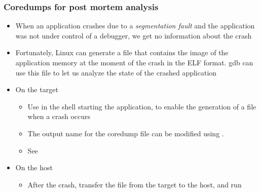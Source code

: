 \begin{frame}
  \frametitle{Coredumps for post mortem analysis}
  \begin{itemize}
  \item When an application crashes due to a {\em segmentation fault}
    and the application was not under control of a debugger, we get no
    information about the crash
  \item Fortunately, Linux can generate a  file that
    contains the image of the application memory at the moment of the
    crash in the ELF format. gdb can use this  file to let
    us analyze the state of the crashed application
  \item On the target
    \begin{itemize}
    \item Use  in the shell starting the
      application, to enable the generation of a  file
      when a crash occurs
    \item The output name for the coredump file can be modified using
      .
    \item See 
    \end{itemize}
  \item On the host
    \begin{itemize}
    \item After the crash, transfer the  file from the target to
      the host, and run
    \end{itemize}
  \end{itemize}
\end{frame}

